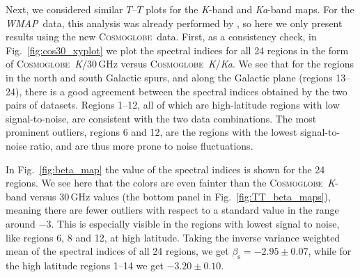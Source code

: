 \documentclass[twocolumn]{../../common/aa}
\def\wmap{\emph{WMAP}}
\newcommand{\cosmoglobe}{\textsc{Cosmoglobe}}
\newcommand{\K}[0]{\textit K}
\newcommand{\Ka}[0]{\textit{Ka}}
\begin{document}
Next, we considered similar $T$--$T$ plots for the \K-band and \Ka-band maps. For the \wmap\ data, this analysis was already performed by \citet{fuskeland2014}, so here we only present results using the new \cosmoglobe\ data. First, as a consistency check, in Fig.~\ref{fig:cos30_xyplot} we plot the spectral indices for all 24 regions in the form of \cosmoglobe\ \K/30\,GHz versus \cosmoglobe\ \K/\Ka. We see that for the regions in the north and south Galactic spurs, and along the Galactic plane (regions 13--24), there is a good agreement between the spectral indices obtained by the two pairs of datasets. Regions 1--12, all of which are high-latitude regions with low signal-to-noise, are consistent with the two data combinations. 
The most prominent outliers, regions 6 and 12, are the regions with the lowest
signal-to-noise ratio, and are thus more prone to noise fluctuations.


In Fig.~\ref{fig:beta_map} the value of the spectral indices is shown for the 24 regions. We see here that the colors are even fainter than the \cosmoglobe\ \K-band versus 30\,GHz values (the bottom panel in Fig.~\ref{fig:TT_beta_maps}), meaning there are fewer outliers with respect to a standard value in the range around $-3$. This is especially visible in the regions with lowest signal to noise, like regions 6, 8 and 12, at high latitude. Taking the inverse variance weighted mean of the spectral indices of all 24 regions, we get $\beta_{\mathrm{s}}=-2.95\pm0.07$, while for the high latitude regions 1--14 we get $-3.20\pm0.10$.




\end{document}
